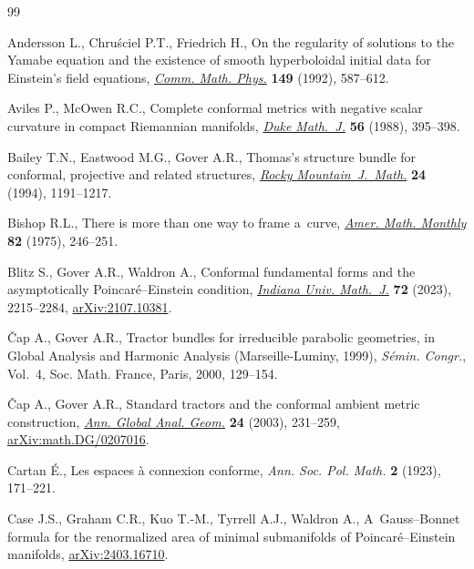 \documentclass[10pt,a4paper]{article}
\numberwithin{equation}{section}
\renewcommand{\=}{\stackrel \Lambda =}
\begin{document}
\begin{thebibliography}{99}
\footnotesize\itemsep=0pt

Andersson L., Chru\'sciel P.T., Friedrich H., On the regularity of solutions to
 the {Y}amabe equation and the existence of smooth hyperboloidal initial data
 for {E}instein's field equations, \href{https://doi.org/10.1007/BF02096944}{\textit{Comm. Math. Phys.}} \textbf{149}
 (1992), 587--612.

Aviles P., McOwen R.C., Complete conformal metrics with negative scalar
 curvature in compact {R}iemannian manifolds, \href{https://doi.org/10.1215/S0012-7094-88-05616-5}{\textit{Duke Math.~J.}}
 \textbf{56} (1988), 395--398.

Bailey T.N., Eastwood M.G., Gover A.R., Thomas's structure bundle for
 conformal, projective and related structures, \href{https://doi.org/10.1216/rmjm/1181072333}{\textit{Rocky
 Mountain~J.~Math.}} \textbf{24} (1994), 1191--1217.

Bishop R.L., There is more than one way to frame a~curve, \href{https://doi.org/10.2307/2319846}{\textit{Amer. Math.
 Monthly}} \textbf{82} (1975), 246--251.

Blitz S., Gover A.R., Waldron A., Conformal fundamental forms and the
 asymptotically {P}oincar\'e--{E}instein condition, \href{https://doi.org/10.1512/iumj.2023.72.9518}{\textit{Indiana Univ.
 Math.~J.}} \textbf{72} (2023), 2215--2284, \href{https://arxiv.org/abs/2107.10381}{arXiv:2107.10381}.

{\v{C}}ap A., Gover A.R., Tractor bundles for irreducible parabolic geometries,
 in Global Analysis and Harmonic Analysis ({M}arseille-{L}uminy, 1999),
 \textit{S\'emin. Congr.}, Vol.~4, Soc. Math. France, Paris, 2000, 129--154.

{\v{C}}ap A., Gover A.R., Standard tractors and the conformal ambient metric
 construction, \href{https://doi.org/10.1023/A:1024726607595}{\textit{Ann. Global Anal. Geom.}} \textbf{24} (2003), 231--259,
 \href{https://arxiv.org/abs/math.DG/0207016}{arXiv:math.DG/0207016}.

Cartan {\'E}., Les espaces \`a connexion conforme, \textit{Ann. Soc. Pol.
 Math.} \textbf{2} (1923), 171--221.

Case J.S., Graham C.R., Kuo T.-M., Tyrrell A.J., Waldron A., A~{G}auss--{B}onnet
 formula for the renormalized area of minimal submanifolds of
 {P}oincar\'e--{E}instein manifolds, \href{https://arxiv.org/abs/2403.16710}{arXiv:2403.16710}.


\end{thebibliography}
\end{document}
